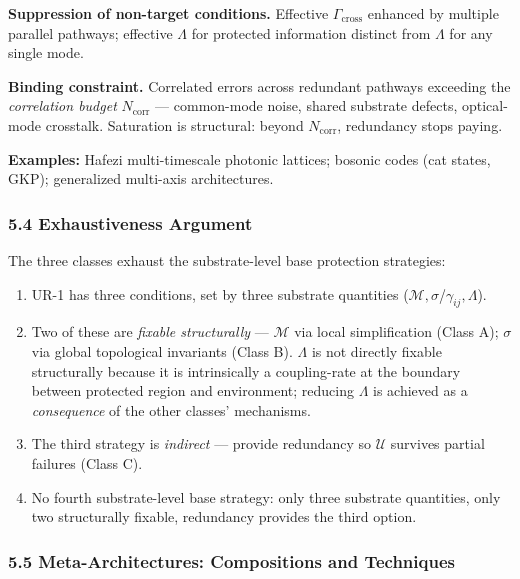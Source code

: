 \documentclass[
  11pt,
  a4paper,
]{article}
\providecommand{\tightlist}{%
  \setlength{\itemsep}{0pt}\setlength{\parskip}{0pt}}
\begin{document}
\textbf{Suppression of non-target conditions.} Effective
\(\Gamma_{\mathrm{cross}}\) enhanced by multiple parallel pathways;
effective \(\Lambda\) for protected information distinct from
\(\Lambda\) for any single mode.

\textbf{Binding constraint.} Correlated errors across redundant pathways
exceeding the \emph{correlation budget} \(N_{\mathrm{corr}}\) ---
common-mode noise, shared substrate defects, optical-mode crosstalk.
Saturation is structural: beyond \(N_{\mathrm{corr}}\), redundancy stops
paying.

\textbf{Examples:} Hafezi multi-timescale photonic lattices; bosonic
codes (cat states, GKP); generalized multi-axis architectures.

\subsubsection{5.4 Exhaustiveness
Argument}\label{exhaustiveness-argument}

The three classes exhaust the substrate-level base protection
strategies:

\begin{enumerate}
\def\labelenumi{\arabic{enumi}.}
\tightlist
\item
  UR-1 has three conditions, set by three substrate quantities
  (\(\mathcal{M}, \sigma\)/\(\gamma_{ij}, \Lambda\)).
\item
  Two of these are \emph{fixable structurally} --- \(\mathcal{M}\) via
  local simplification (Class A); \(\sigma\) via global topological
  invariants (Class B). \(\Lambda\) is not directly fixable structurally
  because it is intrinsically a coupling-rate at the boundary between
  protected region and environment; reducing \(\Lambda\) is achieved as
  a \emph{consequence} of the other classes' mechanisms.
\item
  The third strategy is \emph{indirect} --- provide redundancy so
  \(\mathcal{U}\) survives partial failures (Class C).
\item
  No fourth substrate-level base strategy: only three substrate
  quantities, only two structurally fixable, redundancy provides the
  third option.
\end{enumerate}

\subsubsection{5.5 Meta-Architectures: Compositions and
Techniques}\label{meta-architectures-compositions-and-techniques}
\end{document}
